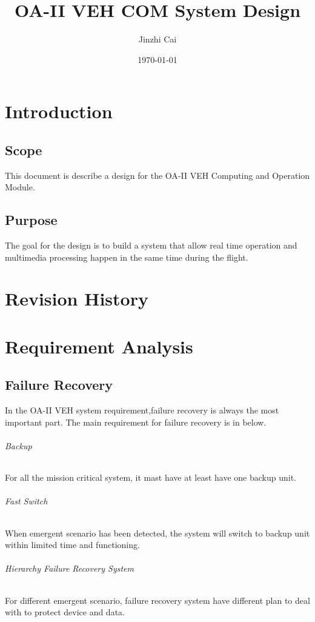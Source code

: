 \documentclass[12pt,article]{memoir}
\title{OA-II VEH COM System Design}
\author{Jinzhi Cai}
\date{\today}
\begin{document}
	


\tableofcontents*
\clearpage



\chapter{Introduction}
\section{Scope}
This document is describe a design for the OA-II VEH Computing and Operation Module.
\section{Purpose}
The goal for the design is to build a system that allow real time operation and multimedia processing happen in the same time during the flight.
\chapter{Revision History}
\begin{table}[H]
	\centering
	\caption{Summary of Revision History}
	\label{tab:rev}
\end{table}
\newpage
\chapter{Requirement Analysis}
\section{Failure Recovery}
In the OA-II VEH system requirement,failure recovery is always the most important part. The main requirement for failure recovery is in below.
\subparagraph{Backup}For all the mission critical system, it mast have at least have one backup unit.
\subparagraph{Fast Switch} When emergent scenario has been detected, the system will switch to backup unit within limited time and functioning.
\subparagraph{Hierarchy Failure Recovery System} For different emergent scenario, failure recovery system have different plan to deal with to protect device and data.
\end{document}
